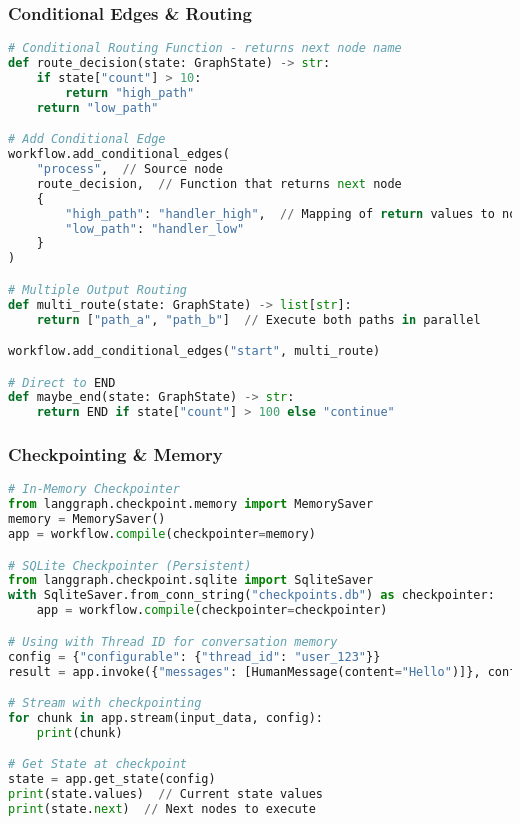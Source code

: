 \begin{frame}[fragile]\frametitle{Conditional Edges \& Routing}
      \begin{lstlisting}[language=python,basicstyle=\tiny]
# Conditional Routing Function - returns next node name
def route_decision(state: GraphState) -> str:
    if state["count"] > 10:
        return "high_path"
    return "low_path"

# Add Conditional Edge
workflow.add_conditional_edges(
    "process",  // Source node
    route_decision,  // Function that returns next node
    {
        "high_path": "handler_high",  // Mapping of return values to nodes
        "low_path": "handler_low"
    }
)

# Multiple Output Routing
def multi_route(state: GraphState) -> list[str]:
    return ["path_a", "path_b"]  // Execute both paths in parallel

workflow.add_conditional_edges("start", multi_route)

# Direct to END
def maybe_end(state: GraphState) -> str:
    return END if state["count"] > 100 else "continue"
  \end{lstlisting}
\end{frame}

\begin{frame}[fragile]\frametitle{Checkpointing \& Memory}
      \begin{lstlisting}[language=python,basicstyle=\tiny]
# In-Memory Checkpointer
from langgraph.checkpoint.memory import MemorySaver
memory = MemorySaver()
app = workflow.compile(checkpointer=memory)

# SQLite Checkpointer (Persistent)
from langgraph.checkpoint.sqlite import SqliteSaver
with SqliteSaver.from_conn_string("checkpoints.db") as checkpointer:
    app = workflow.compile(checkpointer=checkpointer)

# Using with Thread ID for conversation memory
config = {"configurable": {"thread_id": "user_123"}}
result = app.invoke({"messages": [HumanMessage(content="Hello")]}, config)

# Stream with checkpointing
for chunk in app.stream(input_data, config):
    print(chunk)

# Get State at checkpoint
state = app.get_state(config)
print(state.values)  // Current state values
print(state.next)  // Next nodes to execute
  \end{lstlisting}
\end{frame}

